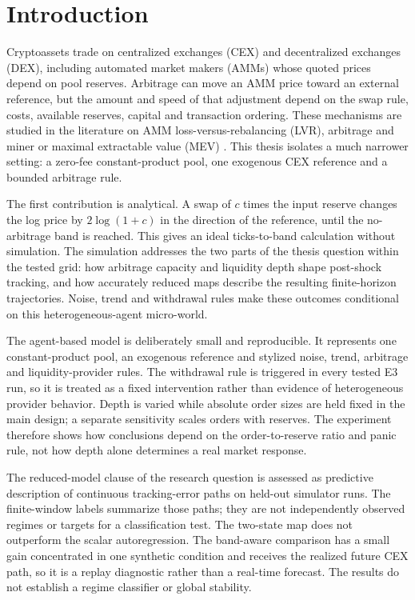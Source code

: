 \chapter{Introduction}
\label{cap:introduccion}

Cryptoassets trade on centralized exchanges (CEX) and decentralized exchanges (DEX), including automated market makers (AMMs) whose quoted prices depend on pool reserves. Arbitrage can move an AMM price toward an external reference, but the amount and speed of that adjustment depend on the swap rule, costs, available reserves, capital and transaction ordering. These mechanisms are studied in the literature on AMM loss-versus-rebalancing (LVR), arbitrage and miner or maximal extractable value (MEV) \cite{milionis2022lvr,daian2020flash,zhou2021hft}. This thesis isolates a much narrower setting: a zero-fee constant-product pool, one exogenous CEX reference and a bounded arbitrage rule.

The first contribution is analytical. A swap of $c$ times the input reserve changes the log price by $2\log(1+c)$ in the direction of the reference, until the no-arbitrage band is reached. This gives an ideal ticks-to-band calculation without simulation. The simulation addresses the two parts of the thesis question within the tested grid: how arbitrage capacity and liquidity depth shape post-shock tracking, and how accurately reduced maps describe the resulting finite-horizon trajectories. Noise, trend and withdrawal rules make these outcomes conditional on this heterogeneous-agent micro-world.

The agent-based model is deliberately small and reproducible. It represents one constant-product pool, an exogenous reference and stylized noise, trend, arbitrage and liquidity-provider rules. The withdrawal rule is triggered in every tested E3 run, so it is treated as a fixed intervention rather than evidence of heterogeneous provider behavior. Depth is varied while absolute order sizes are held fixed in the main design; a separate sensitivity scales orders with reserves. The experiment therefore shows how conclusions depend on the order-to-reserve ratio and panic rule, not how depth alone determines a real market response.

The reduced-model clause of the research question is assessed as predictive description of continuous tracking-error paths on held-out simulator runs. The finite-window labels summarize those paths; they are not independently observed regimes or targets for a classification test. The two-state map does not outperform the scalar autoregression. The band-aware comparison has a small gain concentrated in one synthetic condition and receives the realized future CEX path, so it is a replay diagnostic rather than a real-time forecast. The results do not establish a regime classifier or global stability.

